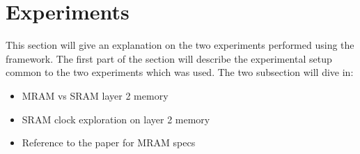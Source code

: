 \section{Experiments}
This section will give an explanation on the two experiments performed using the framework.
The first part of the section will describe the experimental setup common to the two experiments which was used.
The two subsection will dive in:
\begin{itemize}
	\item MRAM vs SRAM layer 2 memory
	\item SRAM clock exploration on layer 2 memory
	\item Reference to the paper for MRAM specs~\cite{8310393}
\end{itemize}
